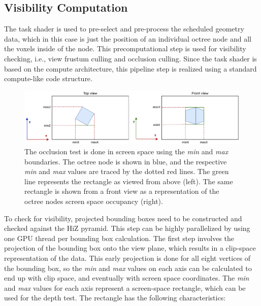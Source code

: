 \subsection*{Visibility Computation} \label{subsec-visibility-computation}

The task shader is used to pre-select and pre-process the scheduled geometry data, which in this case is just 
the position of an individual octree node and all the voxels inside of the node. This precomputational step is 
used for visibility checking, i.e., view frustum culling and occlusion culling. Since the task shader is based 
on the compute architecture, this pipeline step is realized using a standard compute-like code structure. \\

\begin{figure}[!htb]
    \centering
    \includegraphics[width=\linewidth]{images/graphics/screen_space_occlusion_test.jpg}
    \caption{The occlusion test is done in screen space using the \emph{min} and \emph{max} boundaries. The octree node 
    is shown in blue, and the respective \emph{min} and \emph{max} values are traced by the dotted red lines. The green 
    line represents the rectangle as viewed from above (left). The same rectangle is shown from a front view as a 
    representation of the octree nodes screen space occupancy (right).}
    \label{fig:screen-space-occlusion-test}
\end{figure}

\noindent
To check for visibility, projected bounding boxes need to be constructed and checked against the 
\ac{HiZ} pyramid. This step can be highly parallelized by using one \ac{GPU} thread per bounding box 
calculation. The first step involves the projection of the bounding box onto the view plane, which results 
in a clip-space representation of the data. This early projection is done for all eight vertices of the 
bounding box, so the \emph{min} and \emph{max} values on each axis can be calculated to end up with clip space, 
and eventually with screen space coordinates. The \emph{min} and \emph{max} values for each axis represent 
a screen-space rectangle, which can be used for the depth test. The rectangle has the following characteristics:


